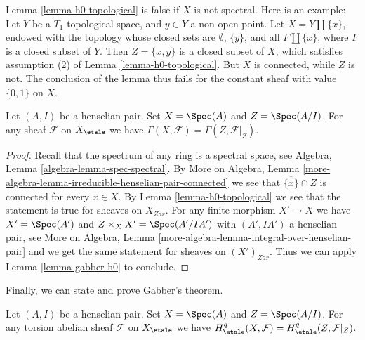 \begin{example}
\label{example-quinard}
Lemma \ref{lemma-h0-topological} is false if $X$ is not spectral.
Here is an example: Let $Y$ be a $T_1$ topological space, and
$y \in Y$ a non-open point. Let $X = Y \amalg \{ x \}$, endowed with
the topology whose closed sets are $\emptyset$, $\{y\}$, and all
$F \amalg \{ x \}$, where $F$ is a closed subset of $Y$. Then
$Z = \{x, y\}$ is a closed subset of $X$, which satisfies assumption (2)
of Lemma \ref{lemma-h0-topological}. But $X$ is connected, while $Z$ is not.
The conclusion of the lemma thus fails for the constant sheaf
with value $\{0, 1\}$ on $X$.
\end{example}

\begin{lemma}
\label{lemma-h0-henselian-pair}
Let $(A, I)$ be a henselian pair. Set $X = \Spec(A)$ and
$Z = \Spec(A/I)$. For any sheaf $\mathcal{F}$ on $X_\etale$
we have $\Gamma(X, \mathcal{F}) = \Gamma(Z, \mathcal{F}|_Z)$.
\end{lemma}

\begin{proof}
Recall that the spectrum of any ring is a spectral space, see
Algebra, Lemma \ref{algebra-lemma-spec-spectral}. By
More on Algebra, Lemma
\ref{more-algebra-lemma-irreducible-henselian-pair-connected}
we see that $\overline{\{x\}} \cap Z$ is connected for every $x \in X$.
By Lemma \ref{lemma-h0-topological} we see that the statement
is true for sheaves on $X_{Zar}$. For any finite morphism $X' \to X$
we have $X' = \Spec(A')$ and $Z \times_X X' = \Spec(A'/IA')$
with $(A', IA')$ a henselian pair, see More on Algebra, Lemma
\ref{more-algebra-lemma-integral-over-henselian-pair}
and we get the same statement for sheaves on $(X')_{Zar}$.
Thus we can apply Lemma \ref{lemma-gabber-h0} to conclude.
\end{proof}

\noindent
Finally, we can state and prove Gabber's theorem.

\begin{theorem}[Gabber]
\label{theorem-gabber}
Let $(A, I)$ be a henselian pair. Set $X = \Spec(A)$ and
$Z = \Spec(A/I)$. For any torsion abelian sheaf $\mathcal{F}$ on $X_\etale$
we have $H^q_\etale(X, \mathcal{F}) = H^q_\etale(Z, \mathcal{F}|_Z)$.
\end{theorem}

